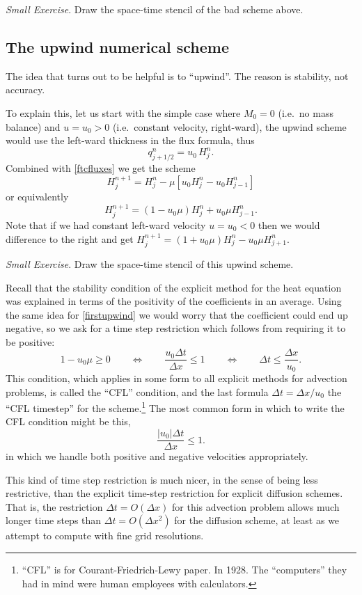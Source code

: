 \documentclass[titlepage,a4paper,final,12pt]{scrartcl}
\begin{document}
\medskip
\noindent \emph{Small Exercise}.  Draw the space-time stencil of the bad scheme above.
\medskip

\subsection*{The upwind numerical scheme}   The idea that turns out to be helpful is to ``upwind''.  The reason is stability, not accuracy.  

To explain this, let us start with the simple case where $M_0=0$ (i.e.~no mass balance) and $u=u_0>0$ (i.e.~constant velocity, right-ward), the upwind scheme would use the left-ward thickness in the flux formula, thus
	$$q_{j+1/2}^n = u_0 \, H_j^n.$$
Combined with \eqref{ftcfluxes} we get the scheme
   $$H_j^{n+1} = H_j^n - \mu \left[u_0 H_j^n - u_0 H_{j-1}^n\right]$$
or equivalently
\begin{equation}
H_j^{n+1} = (1 - u_0 \mu) H_j^n + u_0 \mu H_{j-1}^n.  \label{firstupwind}
\end{equation}
Note that if we had constant left-ward velocity $u=u_0<0$ then we would difference to the right and get $H_j^{n+1} = (1 + u_0 \mu) H_j^n - u_0 \mu H_{j+1}^n$.

\medskip
\noindent \emph{Small Exercise}.  Draw the space-time stencil of this upwind scheme.
\medskip

Recall that the stability condition of the explicit method for the heat equation was explained in terms of the positivity of the coefficients in an average.  Using the same idea for \eqref{firstupwind} we would worry that the coefficient could end up negative, so we ask for a time step restriction which follows from requiring it to be positive:
   $$1 - u_0 \mu \ge 0 \qquad \iff \qquad \frac{u_0 \Delta t}{\Delta x} \le 1 \qquad \iff \qquad \Delta t \le \frac{\Delta x}{u_0}.$$
This condition, which applies in some form to all explicit methods for advection problems, is called the ``CFL'' condition, and the last formula $\Delta t = \Delta x/u_0$ the ``CFL timestep'' for the scheme.\footnote{``CFL'' is for Courant-Friedrich-Lewy paper.  In 1928.  The ``computers'' they had in mind were human employees with calculators.}  The most common form in which to write the CFL condition might be this,
\begin{equation}
\frac{|u_0| \Delta t}{\Delta x} \le 1.  \label{cfl}
\end{equation}
in which we handle both positive and negative velocities appropriately.

This kind of time step restriction is much nicer, in the sense of being less restrictive, than the explicit time-step restriction for explicit diffusion schemes.  That is, the restriction $\Delta t = O(\Delta x)$ for this advection problem allows much longer time steps than $\Delta t = O(\Delta x^2)$ for the diffusion scheme, at least as we attempt to compute with fine grid resolutions.
\end{document}
